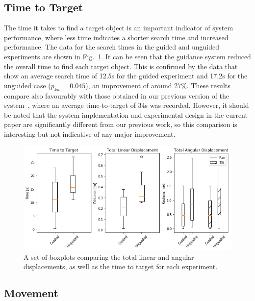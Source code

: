 \documentclass[runningheads]{llncs}
\DeclareRobustCommand{\tofix}[1]{{\sethlcolor{yellow}\hl{[#1]}}}
\begin{document}
\subsection{Time to Target}

The time it takes to find a target object is an important indicator of system performance, where less time indicates a shorter search time and increased performance.
The data for the search times in the guided and unguided experiments are shown in Fig.~\ref{fig:boxplots}.
%
It can be seen that the guidance system reduced the overall time to find each target object.
This is confirmed by the data that show an average search time of 12.5s for the guided experiment and 17.2s for the unguided case ($p_{kw}=0.045$), an improvement of around 27\%.
These results compare also favourably with those obtained in our previous version of the system~\cite{lock2019active}, where an average time-to-target of 34s was recorded.%
However, it should be noted that the system implementation and experimental design in the current paper are significantly different from our previous work, so this comparison is interesting but not indicative of any major improvement.

\begin{figure}[t]
  \centering
  \includegraphics[width=1.0\textwidth]{figures/boxplot_combined.png}
  \caption{A set of boxplots comparing the total linear and angular displacements, as well as the time to target for each experiment.}\label{fig:boxplots}
\end{figure}

\subsection{Movement}
\end{document}

